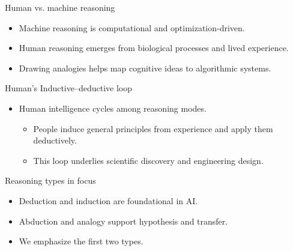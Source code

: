 \documentclass[12pt]{beamer}
\begin{document}
\begin{frame}{Human vs. machine reasoning}
  \begin{itemize}
    \item Machine reasoning is computational and optimization-driven.
    \item Human reasoning emerges from biological processes and lived experience.
    \item Drawing analogies helps map cognitive ideas to algorithmic systems.
  \end{itemize}
\end{frame}

\begin{frame}{Human's Inductive--deductive loop}
  \begin{itemize}
    \item Human intelligence cycles among reasoning modes.
      \begin{itemize}
        \item People induce general principles from experience and apply them deductively.
        \item This loop underlies scientific discovery and engineering design.
      \end{itemize}
  \end{itemize}
\end{frame}



\begin{frame}{Reasoning types in focus}
  \begin{itemize}
    \item Deduction and induction are foundational in AI.
    \item Abduction and analogy support hypothesis and transfer.
    \item We emphasize the first two types.
  \end{itemize}
\end{frame}
\end{document}
